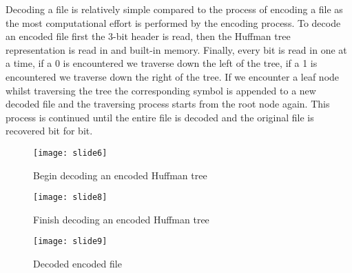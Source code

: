 Decoding a file is relatively simple compared to the process of encoding a file as the most computational effort is performed by the encoding process. To decode an encoded file first the 3-bit header is read, then the Huffman tree representation is read in and built-in memory. Finally, every bit is read in one at a time, if a 0 is encountered we traverse down the left of the tree, if a 1 is encountered we traverse down the right of the tree. If we encounter a leaf node whilst traversing the tree the corresponding symbol is appended to a new decoded file and the traversing process starts from the root node again. This process is continued until the entire file is decoded and the original file is recovered bit for bit.


\begin{figure}[H]
\caption{Begin decoding an encoded Huffman tree}
\texttt{[image: slide6]}
\centering
\end{figure}


\begin{figure}[H]
\caption{Finish decoding an encoded Huffman tree}
\texttt{[image: slide8]}
\centering
\end{figure}


\begin{figure}[H]
\caption{Decoded encoded file}
\texttt{[image: slide9]}
\centering
\end{figure}